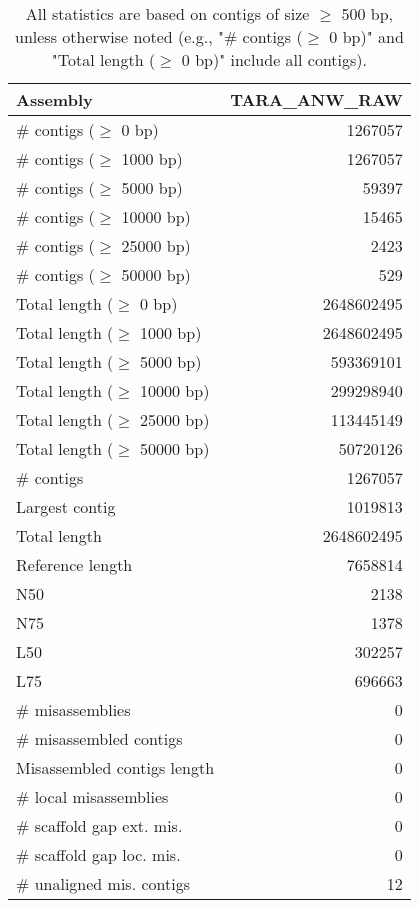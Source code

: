 \documentclass[12pt,a4paper]{article}
\begin{document}
\begin{table}[ht]
\begin{center}
\caption{All statistics are based on contigs of size $\geq$ 500 bp, unless otherwise noted (e.g., "\# contigs ($\geq$ 0 bp)" and "Total length ($\geq$ 0 bp)" include all contigs).}
\begin{tabular}{|l*{1}{|r}|}
\hline
Assembly & TARA\_ANW\_RAW \\ \hline
\# contigs ($\geq$ 0 bp) & 1267057 \\ \hline
\# contigs ($\geq$ 1000 bp) & 1267057 \\ \hline
\# contigs ($\geq$ 5000 bp) & 59397 \\ \hline
\# contigs ($\geq$ 10000 bp) & 15465 \\ \hline
\# contigs ($\geq$ 25000 bp) & 2423 \\ \hline
\# contigs ($\geq$ 50000 bp) & 529 \\ \hline
Total length ($\geq$ 0 bp) & 2648602495 \\ \hline
Total length ($\geq$ 1000 bp) & 2648602495 \\ \hline
Total length ($\geq$ 5000 bp) & 593369101 \\ \hline
Total length ($\geq$ 10000 bp) & 299298940 \\ \hline
Total length ($\geq$ 25000 bp) & 113445149 \\ \hline
Total length ($\geq$ 50000 bp) & 50720126 \\ \hline
\# contigs & 1267057 \\ \hline
Largest contig & 1019813 \\ \hline
Total length & 2648602495 \\ \hline
Reference length & 7658814 \\ \hline
N50 & 2138 \\ \hline
N75 & 1378 \\ \hline
L50 & 302257 \\ \hline
L75 & 696663 \\ \hline
\# misassemblies & 0 \\ \hline
\# misassembled contigs & 0 \\ \hline
Misassembled contigs length & 0 \\ \hline
\# local misassemblies & 0 \\ \hline
\# scaffold gap ext. mis. & 0 \\ \hline
\# scaffold gap loc. mis. & 0 \\ \hline
\# unaligned mis. contigs & 12 \\ \hline

\end{tabular}
\end{center}
\end{table}
\end{document}
